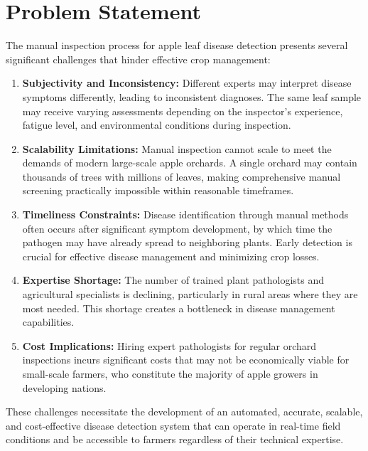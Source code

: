 \documentclass[12pt]{report}
\begin{document}
\section{Problem Statement}

The manual inspection process for apple leaf disease detection presents several significant challenges that hinder effective crop management:

\begin{enumerate}[leftmargin=*]
\item \textbf{Subjectivity and Inconsistency:} Different experts may interpret disease symptoms differently, leading to inconsistent diagnoses. The same leaf sample may receive varying assessments depending on the inspector's experience, fatigue level, and environmental conditions during inspection.

\item \textbf{Scalability Limitations:} Manual inspection cannot scale to meet the demands of modern large-scale apple orchards. A single orchard may contain thousands of trees with millions of leaves, making comprehensive manual screening practically impossible within reasonable timeframes.

\item \textbf{Timeliness Constraints:} Disease identification through manual methods often occurs after significant symptom development, by which time the pathogen may have already spread to neighboring plants. Early detection is crucial for effective disease management and minimizing crop losses.

\item \textbf{Expertise Shortage:} The number of trained plant pathologists and agricultural specialists is declining, particularly in rural areas where they are most needed. This shortage creates a bottleneck in disease management capabilities.

\item \textbf{Cost Implications:} Hiring expert pathologists for regular orchard inspections incurs significant costs that may not be economically viable for small-scale farmers, who constitute the majority of apple growers in developing nations.
\end{enumerate}

These challenges necessitate the development of an automated, accurate, scalable, and cost-effective disease detection system that can operate in real-time field conditions and be accessible to farmers regardless of their technical expertise.
\end{document}
